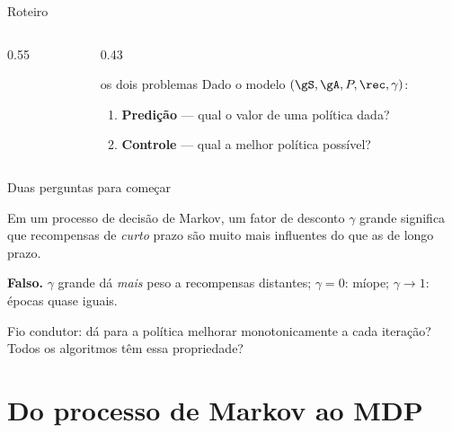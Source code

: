 \documentclass[aspectratio=169, 11pt]{beamer}
\begin{document}
\begin{frame}{Roteiro}
  \begin{columns}[T]
    \begin{column}{0.55\textwidth}
      \tableofcontents[hideallsubsections]
    \end{column}
    \begin{column}{0.43\textwidth}
      \begin{defbox}{os dois problemas}
        Dado o modelo $(\gS,\gA,P,\rec,\gamma)$:
        \begin{enumerate}\setlength{\itemsep}{0.2ex}
          \item \textbf{Predição} --- qual o valor de uma política dada?
          \item \textbf{Controle} --- qual a melhor política possível?
        \end{enumerate}
      \end{defbox}
    \end{column}
  \end{columns}
\end{frame}

\begin{frame}{Duas perguntas para começar}
  \begin{quizbox}{}
    Em um processo de decisão de Markov, um fator de desconto $\gamma$ \alert{grande}
    significa que recompensas de \emph{curto} prazo são muito mais influentes do que as
    de longo prazo.
  \end{quizbox}
  \pause
  \begin{respbox}
    \textbf{Falso.} $\gamma$ grande dá \emph{mais} peso a recompensas distantes;
    $\gamma=0$: míope; $\gamma \to 1$: épocas quase iguais.
  \end{respbox}
  \begin{ideiabox}
    Fio condutor: dá para a política melhorar \alert{monotonicamente} a cada iteração?
    Todos os algoritmos têm essa propriedade?
  \end{ideiabox}
\end{frame}

\section{Do processo de Markov ao MDP}
\end{document}
